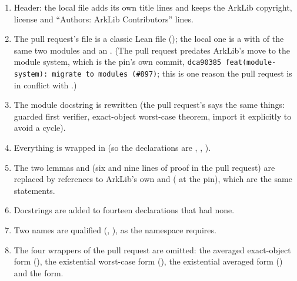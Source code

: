 \begin{enumerate}
\item Header: the local file adds its own title lines and keeps the ArkLib copyright, license and
  \enquote{Authors: ArkLib Contributors} lines.
\item The pull request's file is a classic Lean file (); the local one is a
   with  of the same two modules and an
  . (The pull request predates ArkLib's move to the module system,
  which is the pin's own commit, \texttt{dca90385 feat(module-system): migrate to modules (\#897)};
  this is one reason the pull request is in conflict with .)
\item The module docstring is rewritten (the pull request's says the same things: guarded first
  verifier, exact-object worst-case theorem, import it explicitly to avoid a cycle).
\item Everything is wrapped in \allowbreak{} (so the declarations are
  \allowbreak{}\allowbreak{}\allowbreak{},
  \allowbreak{}\allowbreak{}\allowbreak{}\allowbreak{},
  \allowbreak{}\allowbreak{}\allowbreak{}\allowbreak{}\allowbreak{}\allowbreak{}).
\item The two lemmas  and  (six and nine lines of proof in
  the pull request) are replaced by references to ArkLib's own
  \allowbreak{}\allowbreak{}\allowbreak{}\allowbreak{} and 
  (\allowbreak{} at the pin), which are the same statements.
\item Docstrings are added to fourteen declarations that had none.
\item Two names are qualified (\allowbreak{}\allowbreak{}\allowbreak{},
  \allowbreak{}\allowbreak{}\allowbreak{}), as the namespace requires.
\item The four wrappers of the pull request are omitted: the averaged exact-object form
  (\allowbreak{}\allowbreak{}\allowbreak{}\allowbreak{}), the existential
  worst-case form (\allowbreak{}\allowbreak{}\allowbreak{}), the existential
  averaged form (\allowbreak{}\allowbreak{}\allowbreak{}\allowbreak{}) and the
   form.
\end{enumerate}
